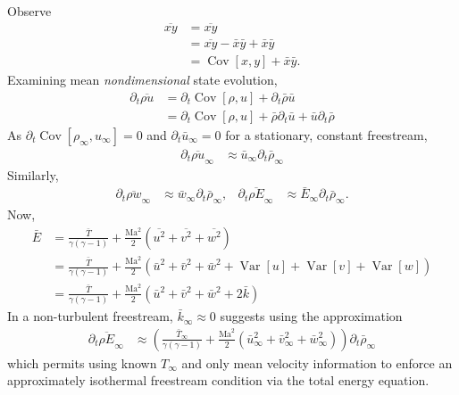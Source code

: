 \documentclass[letterpaper,11pt,nointlimits,reqno]{amsart}
\newcommand{\Mach}[1][]{\mbox{Ma}_{#1}}
\newcommand{\Cov}[2]{\ensuremath{\operatorname{Cov}\left[{#1},{#2}\right]}}
\newcommand{\Var}[1]{\ensuremath{\operatorname{Var}\left[{#1}\right]}}
\begin{document}
Observe
\begin{align}
  \overline{xy} &= \overline{xy}
\\              &= \overline{xy} - \bar{x} \bar{y} + \bar{x} \bar{y}
\\              &= \Cov{x}{y} + \bar{x} \bar{y}
.
\end{align}
Examining mean \emph{nondimensional} state evolution,
\begin{align}
  \partial_t \overline{\rho u} &= \partial_t \Cov{\rho}{u}
                                + \partial_t \bar{\rho} \bar{u}
\\
                               &= \partial_t \Cov{\rho}{u}
                                + \bar{\rho} \partial_t \bar{u}
                                + \bar{u}    \partial_t \bar{\rho}
\end{align}
As $\partial_t \Cov{\rho_\infty}{u_\infty} = 0$ and $\partial_t \bar{u}_\infty
= 0$ for a stationary, constant freestream,
\begin{align}
  \partial_t \overline{\rho u}_\infty
  &\approx \bar{u}_\infty \partial_t \bar{\rho}_\infty
\end{align}
Similarly,
\begin{align}
  \partial_t \overline{\rho w}_\infty
  &\approx \bar{w}_\infty \partial_t \bar{\rho}_\infty,
&
  \partial_t \overline{\rho E}_\infty
  &\approx \bar{E}_\infty \partial_t \bar{\rho}_\infty
  .
\end{align}
Now,
\begin{align}
  \bar{E}
  &= \frac{\bar{T}}{\gamma\left( \gamma-1 \right)}
   + \frac{\Mach^2}{2}\left(\overline{u^2}+\overline{v^2}+\overline{w^2}\right)
\\
  &= \frac{\bar{T}}{\gamma\left( \gamma-1 \right)}
   + \frac{\Mach^2}{2}\left(\bar{u}^2+\bar{v}^2+\bar{w}^2
                            +\Var{u} +\Var{v} +\Var{w}\right)
\\
  &= \frac{\bar{T}}{\gamma\left( \gamma-1 \right)}
   + \frac{\Mach^2}{2}\left(\bar{u}^2+\bar{v}^2+\bar{w}^2+2\bar{k}\right)
\end{align}
In a non-turbulent freestream, $\bar{k}_\infty\approx{}0$ suggests
using the approximation
\begin{align}
  \partial_t \overline{\rho E}_\infty
&\approx
  \left(
         \frac{\bar{T}_\infty}{\gamma\left( \gamma-1 \right)}
       + \frac{\Mach^2}{2}\left(  \bar{u}_\infty^2
                                 +\bar{v}_\infty^2
                                 +\bar{w}_\infty^2\right)
  \right)
  \partial_t \bar{\rho}_\infty
\end{align}
which permits using known $T_\infty$ and only mean velocity information
to enforce an approximately isothermal freestream condition via the
total energy equation.
\end{document}
